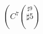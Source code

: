 \documentclass{article}
\begin{document}
\( \left( C^{7}\left(\stackrel{\sharp 9}{\sharp 5}\right) \)
\end{document}
